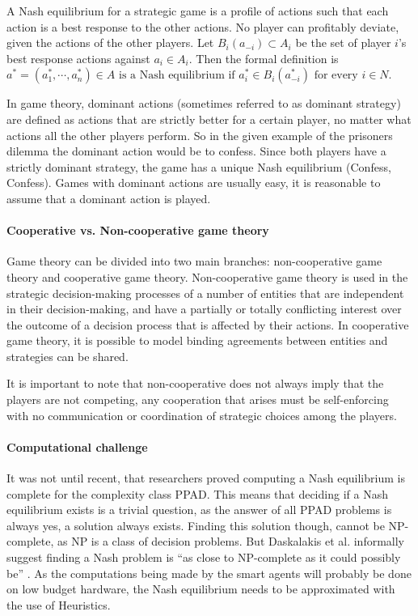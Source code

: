 A Nash equilibrium for a strategic game is a profile of actions such
that each action is a best response to the other actions. No player can profitably deviate, given the actions of the other players. Let $B_i(a_{-i}) \subset A_i$ be the set of player $i$'s best response actions against $a_i \in A_i$. Then the formal definition is
$a^* = (a^*_1, \cdots, a^*_n) \in A \mbox{ is a Nash equilibrium if }
	a^*_i \in B_i(a_{-i}^*) \mbox{ for every } i \in N$.

In game theory, dominant actions (sometimes referred to as dominant strategy) are defined as actions that are strictly better for a certain player, no matter what actions all the other players perform. So in the given example of the prisoners dilemma the dominant action would be to confess. Since both players have a strictly dominant strategy, the game has a unique Nash equilibrium (Confess, Confess). Games with dominant actions are usually easy, it is reasonable to assume that a dominant action is played. 

\paragraph{Cooperative vs. Non-cooperative game theory} 
Game theory can be divided into two main branches: non-cooperative game theory and cooperative game theory. Non-cooperative game theory is used in the strategic decision-making processes of a number of entities that are independent in their decision-making, and have a partially or totally conflicting interest over the outcome of a decision process that is affected by their actions\cite{keypaper}. In cooperative game theory, it is possible to model binding agreements between entities and strategies can be shared. 

It is important to note that non-cooperative does not always imply that the players are not competing, any cooperation that arises must be self-enforcing with no communication or coordination of strategic choices among the players.

\paragraph{Computational challenge} 
It was not until recent, that researchers proved computing a Nash equilibrium is complete for the complexity class PPAD\cite{daskalakis2009complexity}. This means that deciding if a Nash equilibrium exists is a trivial question, as the answer of all PPAD problems is always yes, a solution always exists. Finding this solution though, cannot be NP-complete, as NP is a class of decision problems. But Daskalakis et al. informally suggest finding a Nash problem is ``as close to NP-complete as it could possibly be'' \cite{daskalakis2009complexity, Aaronson2012}. 
As the computations being made by the smart agents will probably be done on low budget hardware, the Nash equilibrium needs to be  approximated with the use of Heuristics. \cite{MicrogridModellingPetrosAristidou,AumannGameTheoryAccomplish} 

